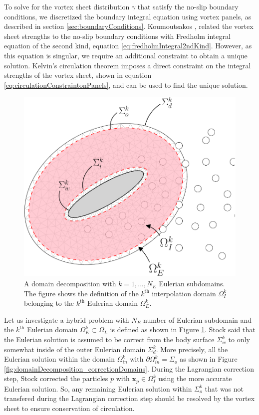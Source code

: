 	To solve for the vortex sheet distribution $\gamma$ that satisfy the no-slip boundary conditions, we discretized the boundary integral equation using vortex panels, as described in section \ref{sec:boundaryConditions}. Koumoutsakos \cite{Koumoutsakos1993b}, related the vortex sheet strengths to the no-slip boundary conditions with Fredholm integral equation of the second kind, equation \ref{eq:fredholmIntegral2ndKind}. However, as this equation is singular, we require an additional constraint to obtain a unique solution. Kelvin's circulation theorem imposes a direct constraint on the integral strengths of the vortex sheet, shown in equation \ref{eq:circulationConstraintonPanels}, and can be used to find the unique solution. 
	
		\begin{figure}[!t]
		\centering
		\includegraphics[width=0.5\linewidth]{./figures/coupling/modifiedDomain/domainDecomposition_kthDomain-crop.pdf}
		\caption{A domain decomposition with $k={1,...,N_E}$ Eulerian subdomains. The figure shows the definition of the $k^{\mathrm{th}}$ interpolation domain $\Omega_I^k$ belonging to the $k^{\mathrm{th}}$ Eulerian domain $\Omega_E^{k}$.}
		\label{fig:domainDecomposition_kthDomain}
		\end{figure}	

	Let us investigate a hybrid problem with $N_E$ number of Eulerian subdomain and the $k^{\mathrm{th}}$ Eulerian domain $\Omega_E^k\subset\Omega_L$ is defined as shown in Figure \ref{fig:domainDecomposition_kthDomain}. Stock \cite{Stock2010a} said that the Eulerian solution is assumed to be correct from the body surface $\Sigma_w^k$ to only somewhat inside of the outer Eulerian domain $\Sigma_d^k$. More precisely, all the Eulerian solution within the domain $\Omega_{in}^k$ with $\partial\Omega_{in}^k = \Sigma_o$ as shown in Figure \ref{fig:domainDecomposition_correctionDomains}. During the Lagrangian correction step, Stock corrected the particles $p$ with $\mathbf{x}_p\in\Omega_I^k$ using the more accurate Eulerian solution. So, any remaining Eulerian solution within $\Sigma_o^k$ that was not transfered during the Lagrangian correction step should be resolved by the vortex sheet to ensure conservation of circulation.
	
